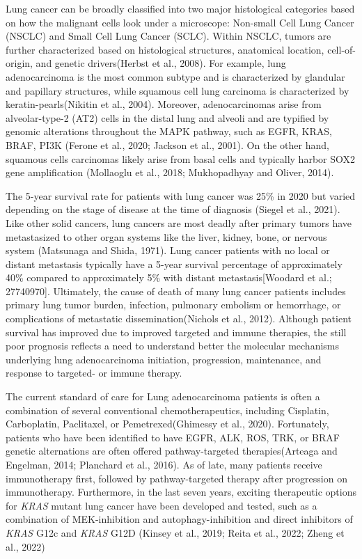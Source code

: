 Lung cancer can be broadly classified into two major histological categories based on how the malignant cells look under a microscope: Non-small Cell Lung Cancer (NSCLC) and Small Cell Lung Cancer (SCLC). Within NSCLC, tumors are further characterized based on histological structures, anatomical location, cell-of-origin, and genetic drivers(Herbst et al., 2008). For example, lung adenocarcinoma is the most common subtype and is characterized by glandular and papillary structures, while squamous cell lung carcinoma is characterized by keratin-pearls(Nikitin et al., 2004). Moreover, adenocarcinomas arise from alveolar-type-2 (AT2) cells in the distal lung and alveoli and are typified by genomic alterations throughout the MAPK pathway, such as EGFR, KRAS, BRAF, PI3K (Ferone et al., 2020; Jackson et al., 2001). On the other hand, squamous cells carcinomas likely arise from basal cells and typically harbor SOX2 gene amplification (Mollaoglu et al., 2018; Mukhopadhyay and Oliver, 2014).

The 5-year survival rate for patients with lung cancer was 25\% in 2020 but varied depending on the stage of disease at the time of diagnosis (Siegel et al., 2021). Like other solid cancers, lung cancers are most deadly after primary tumors have metastasized to other organ systems like the liver, kidney, bone, or nervous system (Matsunaga and Shida, 1971). Lung cancer patients with no local or distant metastasis typically have a 5-year survival percentage of approximately 40\% compared to approximately 5\% with distant metastasis{[}Woodard et al.; 27740970{]}. Ultimately, the cause of death of many lung cancer patients includes primary lung tumor burden, infection, pulmonary embolism or hemorrhage, or complications of metastatic dissemination(Nichols et al., 2012). Although patient survival has improved due to improved targeted and immune therapies, the still poor prognosis reflects a need to understand better the molecular mechanisms underlying lung adenocarcinoma initiation, progression, maintenance, and response to targeted- or immune therapy.

The current standard of care for Lung adenocarcinoma patients is often a combination of several conventional chemotherapeutics, including Cisplatin, Carboplatin, Paclitaxel, or Pemetrexed(Ghimessy et al., 2020). Fortunately, patients who have been identified to have EGFR, ALK, ROS, TRK, or BRAF genetic alternations are often offered pathway-targeted therapies(Arteaga and Engelman, 2014; Planchard et al., 2016). As of late, many patients receive immunotherapy first, followed by pathway-targeted therapy after progression on immunotherapy. Furthermore, in the last seven years, exciting therapeutic options for \emph{KRAS} mutant lung cancer have been developed and tested, such as a combination of MEK-inhibition and autophagy-inhibition and direct inhibitors of \emph{KRAS} G12c and \emph{KRAS} G12D (Kinsey et al., 2019; Reita et al., 2022; Zheng et al., 2022)

